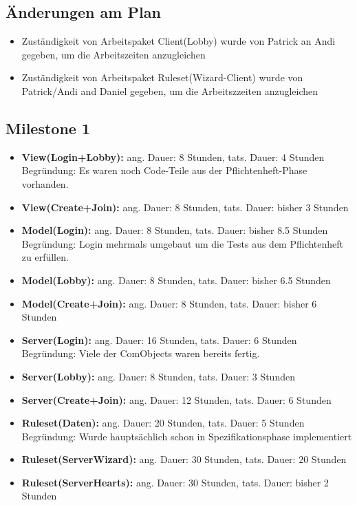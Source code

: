 \documentclass{article}
\begin{document}
\subsection{Änderungen am Plan}
\begin{itemize}
\item Zuständigkeit von Arbeitspaket Client(Lobby) wurde von Patrick an Andi gegeben, um die Arbeitszeiten anzugleichen
\item Zuständigkeit von Arbeitspaket Ruleset(Wizard-Client) wurde von Patrick/Andi and Daniel gegeben, um die Arbeitszzeiten anzugleichen
\end{itemize}

\subsection{Milestone 1}

\begin{itemize}
\item \textbf{View(Login+Lobby):} ang. Dauer: 8 Stunden, tats. Dauer: 4 Stunden \\
Begründung: Es waren noch Code-Teile aus der Pflichtenheft-Phase vorhanden. \\
\item \textbf{View(Create+Join):} ang. Dauer: 8 Stunden, tats. Dauer: bisher 3 Stunden \\
\item \textbf{Model(Login):} ang. Dauer: 8 Stunden, tats. Dauer: bisher 8.5 Stunden \\
Begründung: Login mehrmals umgebaut um die Tests aus dem Pflichtenheft zu erfüllen. \\
\item \textbf{Model(Lobby):} ang. Dauer: 8 Stunden, tats. Dauer: bisher 6.5 Stunden \\
\item \textbf{Model(Create+Join):} ang. Dauer: 8 Stunden, tats. Dauer: bisher 6 Stunden \\
\item \textbf{Server(Login):} ang. Dauer: 16 Stunden, tats. Dauer: 6 Stunden \\
Begründung: Viele der ComObjects waren bereits fertig.
\item \textbf{Server(Lobby):} ang. Dauer: 8 Stunden, tats. Dauer: 3 Stunden 
\item \textbf{Server(Create+Join):} ang. Dauer: 12 Stunden, tats. Dauer: 6 Stunden 
\item \textbf{Ruleset(Daten):} ang. Dauer: 20 Stunden, tats. Dauer: 5 Stunden
Begründung: Wurde hauptsächlich schon in Spezifikationsphase implementiert

\item \textbf{Ruleset(ServerWizard):} ang. Dauer: 30 Stunden, tats. Dauer: 20 Stunden

\item \textbf{Ruleset(ServerHearts):} ang. Dauer: 30 Stunden, tats. Dauer: bisher 2 Stunden
\end{itemize}
\end{document}
